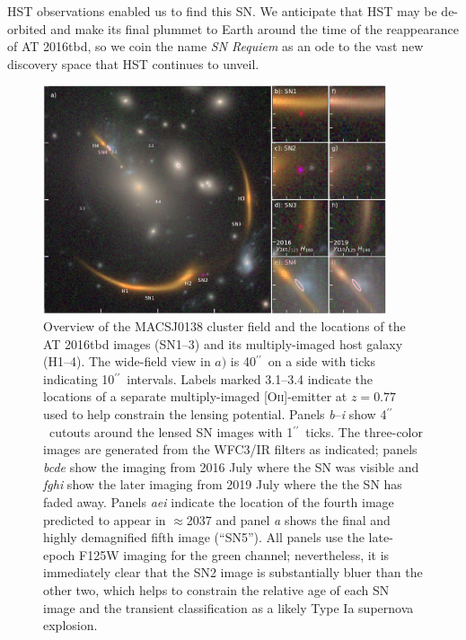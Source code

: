 \documentclass[12pt]{article}
\gdef\arcsec{$^{\prime\prime}$}
\def\TNSname{AT 2016tbd\xspace}
\def\SNABC{AT 2016tbd\xspace}
\begin{document}
HST observations enabled us to find this SN.  We anticipate that HST may be de-orbited and make its final plummet to Earth around the time of the reappearance of \TNSname, so we coin the name {\it SN  Requiem} as an ode to the vast new discovery space that HST continues to unveil.



\clearpage
\begin{figure}
    \centering
    \includegraphics[draft=False,width=0.9\textwidth]{Paper/Figures/fig1_layout.pdf}
    \caption{Overview of the MACSJ0138 cluster field and the locations of the \SNABC images  (SN1--3) and its multiply-imaged host galaxy (H1--4). The wide-field view in $a)$ is 40\arcsec\ on a side with ticks indicating 10\arcsec\ intervals.  
    Labels marked 3.1--3.4 indicate the locations of a separate  multiply-imaged [O\textsc{ii}]-emitter at $z=0.77$ used to help constrain the lensing potential. 
    Panels \emph{b}--\emph{i} show 4\arcsec\ cutouts around the lensed SN images with 1\arcsec\ ticks.  The three-color images are generated from the WFC3/IR filters as indicated; panels \emph{bcde} show the imaging from 2016 July where the SN was visible and \emph{fghi} show the later imaging from 2019 July where the the SN has faded away.  Panels \emph{aei} indicate the location of the fourth image predicted to appear in $\approx$2037 and panel \emph{a} shows the final and highly demagnified fifth image (``SN5''). All panels use the late-epoch F125W imaging for the green channel; nevertheless, it is immediately clear that the SN2 image is substantially bluer than the other two, which helps to constrain the relative age of each SN image and the transient classification as a likely Type Ia supernova explosion. }
    \label{fig:layout}
\end{figure}
\end{document}
